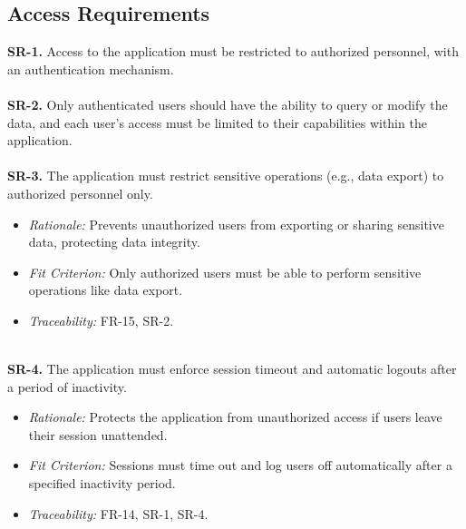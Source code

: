 \documentclass{article}
\begin{document}
\subsection{Access Requirements}
\textbf{SR-1.} Access to the application must be restricted to authorized
  personnel, with an authentication mechanism. \ \\
\ \\
\textbf{SR-2.} Only authenticated users should have the ability to query or
  modify the data, and each user’s access must be limited to their capabilities
  within the application. \ \\
  \ \\
\textbf{SR-3.} The application must restrict sensitive operations (e.g., data export)
  to authorized personnel only.
    \begin{itemize}
      \item \textit{Rationale:} Prevents unauthorized users from exporting or
      sharing sensitive data, protecting data integrity.
      \item \textit{Fit Criterion:} Only authorized users must be able to
      perform sensitive operations like data export.
      \item \textit{Traceability:} FR-15, SR-2.
    \end{itemize}
\ \\
\textbf{SR-4.} The application must enforce session timeout and automatic logouts
after a period of inactivity.
  \begin{itemize}
    \item \textit{Rationale:} Protects the application from unauthorized access if
    users leave their session unattended.
    \item \textit{Fit Criterion:} Sessions must time out and log users off
    automatically after a specified inactivity period.
    \item \textit{Traceability:} FR-14, SR-1, SR-4.
  \end{itemize}
\end{document}
